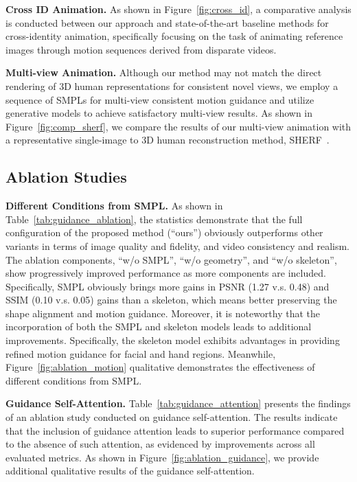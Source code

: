 \textbf{Cross ID Animation.}
As shown in Figure~\ref{fig:cross_id}, a comparative analysis is conducted between our approach and state-of-the-art baseline methods for cross-identity animation, specifically focusing on the task of animating reference images through motion sequences derived from disparate videos.

\textbf{Multi-view Animation.}
Although our method may not match the direct rendering of 3D human representations for consistent novel views, we employ a sequence of SMPLs for multi-view consistent motion guidance and utilize generative models to achieve satisfactory multi-view results.  As shown in Figure~\ref{fig:comp_sherf}, we compare the results of our multi-view animation with a representative single-image to 3D human reconstruction method, SHERF~\cite{hu2023sherf}.

\subsection{Ablation Studies}
\textbf{Different Conditions from SMPL.}
As shown in Table~\ref{tab:guidance_ablation}, the statistics demonstrate that the full configuration of the proposed method (``ours'') obviously outperforms other variants in terms of image quality and fidelity, and video consistency and realism. 
The ablation components, ``w/o SMPL'', ``w/o geometry'', and ``w/o skeleton'', show progressively improved performance as more components are included.
Specifically, SMPL obviously brings more gains in PSNR (1.27 v.s. 0.48) and SSIM (0.10 v.s. 0.05) gains than a skeleton, which means better preserving the shape alignment and motion guidance.
Moreover, it is noteworthy that the incorporation of both the SMPL and skeleton models leads to additional improvements. 
Specifically, the skeleton model exhibits advantages in providing refined motion guidance for facial and hand regions.
Meanwhile, Figure~\ref{fig:ablation_motion} qualitative demonstrates the effectiveness of different conditions from SMPL.

\textbf{Guidance Self-Attention.}
Table~\ref{tab:guidance_attention} presents the findings of an ablation study conducted on guidance self-attention. 
The results indicate that the inclusion of guidance attention leads to superior performance compared to the absence of such attention, as evidenced by improvements across all evaluated metrics. 
As shown in Figure~\ref{fig:ablation_guidance}, we provide additional qualitative results of the guidance self-attention.

